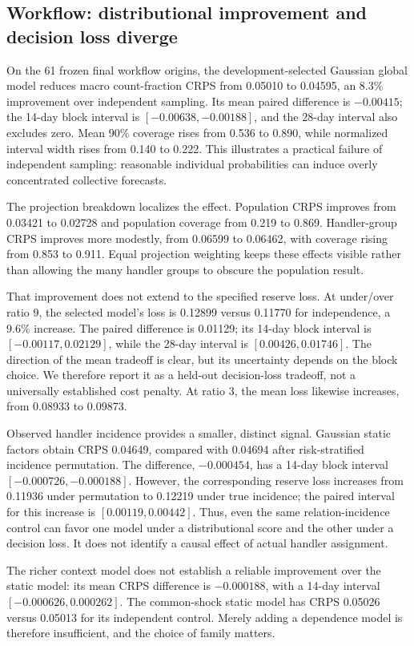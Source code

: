 \subsection{Workflow: distributional improvement and decision loss diverge}
On the 61 frozen final workflow origins, the development-selected Gaussian
global model reduces macro count-fraction CRPS from 0.05010 to 0.04595, an
8.3\% improvement over independent sampling. Its mean paired difference is
$-0.00415$; the 14-day block interval is $[-0.00638,-0.00188]$, and the 28-day
interval also excludes zero. Mean 90\% coverage rises from 0.536 to 0.890,
while normalized interval width rises from 0.140 to 0.222. This illustrates a
practical failure of independent sampling: reasonable individual probabilities
can induce overly concentrated collective forecasts.

The projection breakdown localizes the effect. Population CRPS improves from
0.03421 to 0.02728 and population coverage from 0.219 to 0.869. Handler-group
CRPS improves more modestly, from 0.06599 to 0.06462, with coverage rising from
0.853 to 0.911. Equal projection weighting keeps these effects visible rather
than allowing the many handler groups to obscure the population result.

That improvement does not extend to the specified reserve loss. At under/over
ratio 9, the selected model's loss is 0.12899 versus 0.11770 for independence,
a 9.6\% increase. The paired difference is 0.01129; its 14-day block interval
is $[-0.00117,0.02129]$, while the 28-day interval is $[0.00426,0.01746]$.
The direction of the mean tradeoff is clear, but its uncertainty depends on
the block choice. We therefore report it as a held-out decision-loss tradeoff,
not a universally established cost penalty. At ratio 3, the mean loss likewise
increases, from 0.08933 to 0.09873.

Observed handler incidence provides a smaller, distinct signal. Gaussian
static factors obtain CRPS 0.04649, compared with 0.04694 after risk-stratified
incidence permutation. The difference, $-0.000454$, has a 14-day block interval
$[-0.000726,-0.000188]$. However, the corresponding reserve loss increases
from 0.11936 under permutation to 0.12219 under true incidence; the paired
interval for this increase is $[0.00119,0.00442]$. Thus, even the same
relation-incidence control can favor one model under a distributional score
and the other under a decision loss. It does not identify a causal effect of
actual handler assignment.

The richer context model does not establish a reliable improvement over the
static model: its mean CRPS difference is $-0.000188$, with a 14-day interval
$[-0.000626,0.000262]$. The common-shock static model has CRPS 0.05026 versus
0.05013 for its independent control. Merely adding a dependence model is
therefore insufficient, and the choice of family matters.


